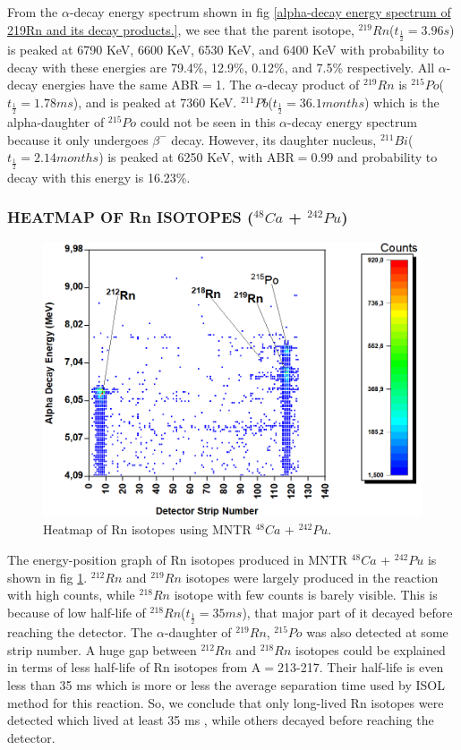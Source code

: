 \documentclass[12pt]{article}
\begin{document}
From the $\alpha$-decay energy spectrum shown in fig \ref{alpha-decay energy spectrum of 219Rn and its decay products.}, we see that the parent isotope, $^{219}Rn$($t_\frac{1}{2}=3.96s$) is peaked at 6790 KeV, 6600 KeV, 6530 KeV, and 6400 KeV with probability to decay with these energies are 79.4\%, 12.9\%, 0.12\%, and 7.5\% respectively. All $\alpha$-decay energies have the same ABR$=$1. The $\alpha$-decay product of $^{219}Rn$ is $^{215}Po$($t_\frac{1}{2}=1.78 ms$), and is peaked at 7360 KeV. $^{211}Pb$($t_\frac{1}{2}=36.1 months$) which is the alpha-daughter of $^{215}Po$ could not be seen in this $\alpha$-decay energy spectrum because it only undergoes $\beta^-$ decay. However, its daughter nucleus, $^{211}Bi$($t_\frac{1}{2}=2.14 months$) is peaked at 6250 KeV, with ABR$=$0.99 and probability to decay with this energy is 16.23\%.  


\subsubsection{HEATMAP OF Rn ISOTOPES ($^{48}Ca$ + $^{242}Pu$)}

\begin{figure}[h]
\centering
\includegraphics[scale=0.5]{Heatmap_Rn(212,218,219).png}
\caption{Heatmap of Rn isotopes using MNTR $^{48}Ca$ + $^{242}Pu$.}
\label{Heatmap of Rn(212, 218, 219) isotopes.}
\end{figure}

The energy-position graph of Rn isotopes produced in MNTR $^{48}Ca$ + $^{242}Pu$ is shown in fig \ref{Heatmap of Rn(212, 218, 219) isotopes.}. $^{212}Rn$ and $^{219}Rn$ isotopes were largely produced in the reaction with high counts, while $^{218}Rn$ isotope with few counts is barely visible. This is because of low half-life of $^{218}Rn$($t_\frac{1}{2}=35 ms$), that major part of it decayed before reaching the detector. The $\alpha$-daughter of $^{219}Rn$, $^{215}Po$ was also detected at some strip number. A huge gap between $^{212}Rn$ and $^{218}Rn$ isotopes could be explained in terms of less half-life of Rn isotopes from A$=$213-217. Their half-life is even less than 35 ms which is more or less the average separation time used by ISOL method for this reaction. So, we conclude that only long-lived Rn isotopes were detected which lived at least 35 ms \cite{vedeneev2017current}, while others decayed before reaching the detector.
\end{document}
